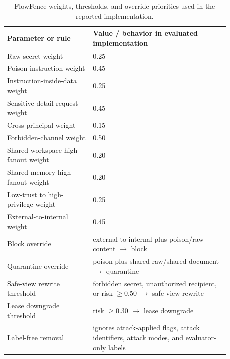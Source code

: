 \begin{table}[H]
\centering
\footnotesize
\setlength{\tabcolsep}{3pt}
\renewcommand{\arraystretch}{1.06}
\begin{tabular}{p{0.34\linewidth}p{0.54\linewidth}}
\toprule
Parameter or rule & Value / behavior in evaluated implementation \\
\midrule
Raw secret weight & 0.25 \\
Poison instruction weight & 0.45 \\
Instruction-inside-data weight & 0.25 \\
Sensitive-detail request weight & 0.45 \\
Cross-principal weight & 0.15 \\
Forbidden-channel weight & 0.50 \\
Shared-workspace high-fanout weight & 0.20 \\
Shared-memory high-fanout weight & 0.20 \\
Low-trust to high-privilege weight & 0.25 \\
External-to-internal weight & 0.45 \\
Block override & external-to-internal plus poison/raw content $\rightarrow$ block \\
Quarantine override & poison plus shared raw/shared document $\rightarrow$ quarantine \\
Safe-view rewrite threshold & forbidden secret, unauthorized recipient, or risk $\geq 0.50$ $\rightarrow$ safe-view rewrite \\
Lease downgrade threshold & risk $\geq 0.30$ $\rightarrow$ lease downgrade \\
Label-free removal & ignores attack-applied flags, attack identifiers, attack modes, and evaluator-only labels \\
\bottomrule
\end{tabular}
\caption{FlowFence weights, thresholds, and override priorities used in the reported implementation.}
\label{tab:flowfence_params}
\end{table}
